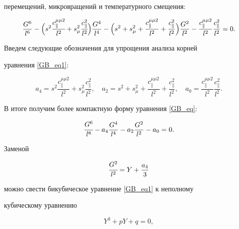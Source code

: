 перемещений, микровращений и температурного смещения:

\begin{equation}\label{GB_eq1}

\dfrac{G^6}{l^6} - \Bigl(s^2 \cfrac{c_{\parallel}^{\mu\mu 2}}{l^2}

+ s_{\mu}^2 \cfrac{c_{\parallel}^2}{l^2}\Bigr) \dfrac{G^4}{l^4} -

\Bigl(s^2 + s_{\mu}^2 + \dfrac{c_{\parallel}^{\mu\mu

2}}{l^2}+\dfrac{c_{\parallel}^2}{l^2}\Bigr) \dfrac{G^2}{l^2} -

\dfrac{c_{\parallel}^{\mu\mu

2}}{l^2}\dfrac{c_{\parallel}^2}{l^2}=0.

\end{equation}



Введем следующие обозначения для упрощения анализа корней

уравнения \eqref{GB_eq1}:

\begin{equation}\label{GB_eq2}

a_4= s^2 \dfrac{c_{\parallel}^{\mu\mu 2}}{l^2} + s_{\mu}^2 \dfrac{c_{\parallel}^2}{l^2}, \quad

a_2=s^2 + s_{\mu}^2 + \dfrac{c_{\parallel}^{\mu\mu 2}}{l^2}+\dfrac{c_{\parallel}^2}{l^2}, \quad

a_0= \dfrac{c_{\parallel}^{\mu\mu 2}}{l^2}\dfrac{c_{\parallel}^2}{l^2}.

\end{equation}

В итоге получим более компактную форму уравнения \eqref{GB_eq}:

\begin{equation}\label{GB_eq3}

\cfrac{G^6}{l^6} - a_4 \dfrac{G^4}{l^4} - a_2 \dfrac{G^2}{l^2} -

a_0=0.

\end{equation}



Заменой

$$\cfrac{G^2}{l^{2}}=Y+\dfrac{a_4}{3}$$

можно свести бикубическое уравнение \eqref{GB_eq1} к неполному

кубическому уравнению

\begin{equation}\label{neocube}

Y^3+pY+q=0,

\end{equation}

